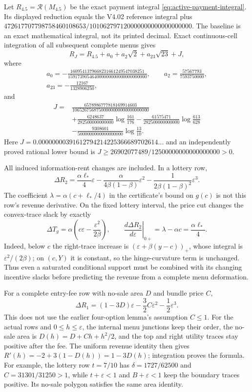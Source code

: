 Let $R_{4.5}=\mathcal R(M_{4.5})$ be the exact payment integral
\eqref{eq:active-payment-integral}. Its displayed reduction equals the V4.02
reference integral plus
$472617707798758460108653/101062797120000000000000000000$.
The baseline is an exact mathematical integral, not its printed decimal.
Exact continuous-cell integration of all subsequent complete menus gives
\begin{equation}\label{eq:joint-revenue}
R_J=R_{4.5}+a_0+a_2\sqrt2+a_{23}\sqrt{23}+J,
\end{equation}
where
\[
\begin{gathered}
a_0=-\frac{1609541379668231661249547038251}
              {159173905464000000000000000000000},\qquad
 a_2=\frac{57567793}{7593750000},\\
a_{23}=-\frac{12167}{1328906250},
\end{gathered}
\]
and
\[
\begin{split}
J={}&\frac{6578986777818169914603}{10652675687500000000000000000000}\\
&+\frac{6248637}{282500000000000}\log\frac{161}{176}
-\frac{61575471}{282500000000000}\log\frac{613}{628}\\
&-\frac{9308601}{5000000000000000000}\log\frac{13}{10}.
\end{split}
\]
Here $J=0.00000000391612794214225366689702614\ldots$ and an independently
proved rational lower bound is $J\ge26902077489/12500000000000000000>0$.

All induced information-rent changes are included. In a lottery row,
\[
\Delta R_2=\frac{\alpha\ell_*}{4}\varepsilon
-\frac{\alpha}{4\beta(1-\beta)}\varepsilon^2
-\frac{1}{2\beta(1-\beta)^2}\varepsilon^3.
\]
The coefficient $\lambda=\alpha(c+\ell_*/4)$ in the certificate's bound
on $g(c)$ is not this row's revenue derivative. On the fixed lottery interval,
the price cut changes the convex-trace slack by exactly
\[
 \Delta T_g=\alpha\left(c\varepsilon-\frac{\varepsilon^2}{2\beta}\right),
 \qquad
 \left.\frac{d\Delta R_2}{d\varepsilon}\right|_{0+}
       =\lambda-\alpha c=\frac{\alpha\ell_*}{4}.
\]
Indeed, below $c$ the right-trace increase is
$(\varepsilon+\beta(y-c))_+$, whose integral is
$\varepsilon^2/(2\beta)$; on $(c,Y)$ it is constant, so the hinge-curvature
term is unchanged. Thus even a saturated conditional support must be combined
with its changing incentive slacks before predicting the revenue from a
complete menu deformation.

For a complete entry-fee row with no-sale area $D$ and bundle price $C$,
\[
\Delta R_1=(1-3D)\varepsilon-\frac32 C\varepsilon^2-\frac12\varepsilon^3.
\]
This does not use the earlier four-option lemma's assumption $C\le1$.
For the actual rows and $0\le h\le\varepsilon$, the internal menu junctions
keep their order, the no-sale area is $D(h)=D+Ch+h^2/2$, and the top and
right utility traces stay positive after the fee. The uniform revenue
identity then gives $R'(h)=-2+3(1-D(h))=1-3D(h)$; integration proves the
formula. For example, the lottery row $t=7/10$ has
$\delta=1727/62500$ and $C=31301/31250>1$, while $t+\varepsilon<1$ and
$B+\varepsilon<1$ keep the boundary traces positive. Its no-sale polygon
satisfies the same area identity.

